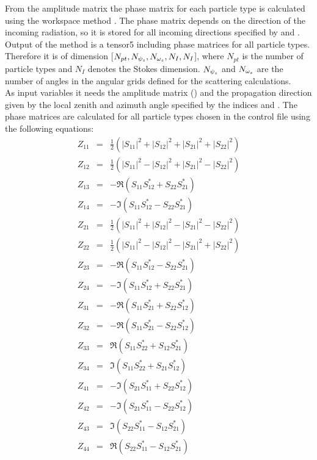 \label{sec:scattering:pha_mat_spt}

From the amplitude matrix the phase matrix for each
particle type is calculated using the workspace method
. The phase matrix depends on the
direction of the incoming radiation, so it is stored for all incoming
directions specified by  and
.\\
Output of the method is a tensor5 including phase matrices for all particle
types. Therefore it is  of  dimension
[$N_{pt}, N_{{\psi_s}}, N_{{\omega_s}}, N_{I}, N_{I}$], where $N_{pt}$ is
the number of particle
types  and $N_{I}$ denotes the Stokes dimension. $N_{{\psi_s}}$ and
$N_{{\omega_s}}$ are the number of angles in the angular grids defined for
the scattering calculations.\\
As input variables it needs the amplitude matrix ()
and the propagation direction given by the local zenith and azimuth
angle specified by the indices  and
.  
The phase matrices \PhaMat{} are
calculated for all particle types chosen in the control
file using the following equations: 
\begin{eqnarray}
  Z_{11} &=& \frac{1}{2}(|S_{11}|^2+|S_{12}|^2+|S_{21}|^2+|S_{22}|^2)\\
  Z_{12} &=& \frac{1}{2}(|S_{11}|^2-|S_{12}|^2+|S_{21}|^2-|S_{22}|^2)\\
  Z_{13} &=& -\Re(S_{11}S_{12}^*+S_{22}S_{21}^*)\\
  Z_{14} &=& -\Im(S_{11}S_{12}^*-S_{22}S_{21}^*)\\
  Z_{21} &=& \frac{1}{2}(|S_{11}|^2+|S_{12}|^2-|S_{21}|^2-|S_{22}|^2)\\
  Z_{22} &=& \frac{1}{2}(|S_{11}|^2-|S_{12}|^2-|S_{21}|^2+|S_{22}|^2)\\
  Z_{23} &=& -\Re(S_{11}S_{12}^*-S_{22}S_{21}^*)\\
  Z_{24} &=& -\Im(S_{11}S_{12}^*+S_{22}S_{21}^*)\\
  Z_{31} &=& -\Re(S_{11}S_{21}^*+S_{22}S_{12}^*)\\
  Z_{32} &=& -\Re(S_{11}S_{21}^*-S_{22}S_{12}^*)\\
  Z_{33} &=& \Re(S_{11}S_{22}^*+S_{12}S_{21}^*)\\
  Z_{34} &=& \Im(S_{11}S_{22}^*+S_{21}S_{12}^*)\\
  Z_{41} &=& -\Im(S_{21}S_{11}^*+S_{22}S_{12}^*)\\
  Z_{42} &=& -\Im(S_{21}S_{11}^*-S_{22}S_{12}^*)\\
  Z_{43} &=& \Im(S_{22}S_{11}^*-S_{12}S_{21}^*)\\
  Z_{44} &=& \Re(S_{22}S_{11}^*-S_{12}S_{21}^*)
\end{eqnarray}






